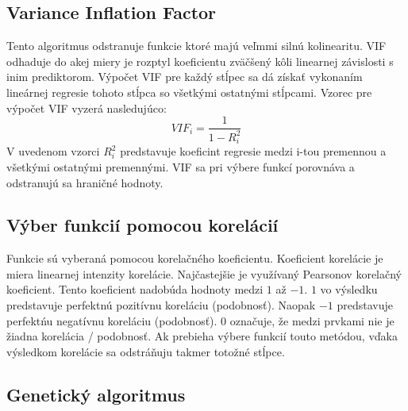 \documentclass[runningheads]{llncs}
\begin{document}
\subsection{Variance Inflation Factor}
Tento algoritmus odstranuje funkcie ktoré majú veľmmi silnú kolinearitu.
VIF odhaduje do akej miery je rozptyl koeficientu zväčšený kôli linearnej závislosti
s inim prediktorom. Výpočet VIF pre každý stĺpec sa dá získať vykonaním lineárnej 
regresie tohoto stĺpca so všetkými ostatnými stĺpcami.\cite{ref_xu}
Vzorec pre výpočet VIF vyzerá nasledujúco:
\begin{equation}
VIF_{i}=\frac{1}{1-R_{i}^{2}}
\end{equation}    
V uvedenom vzorci \begin{math}R_i^2\end{math} predstavuje koeficint regresie medzi i-tou premennou a 
všetkými ostatnými premennými. VIF sa pri výbere funkcí porovnáva a odstranujú sa hraničné hodnoty.\cite{ref_xu}

\subsection{Výber funkcií pomocou korelácií}
Funkcie sú vyberaná pomocou korelačného koeficientu. Koeficient korelácie je miera linearnej intenzity 
korelácie. Najčastejšie je využívaný Pearsonov korelačný koeficient. Tento koeficient nadobúda hodnoty medzi
\begin{math}1\end{math} až \begin{math}-1\end{math}. \begin{math}1\end{math} vo výsledku predstavuje perfektnú pozitívnu 
koreláciu (podobnosť). Naopak \begin{math}-1\end{math} predstavuje 
perfektńu negatívnu koreláciu (podobnosť). \begin{math}0\end{math} označuje, že medzi prvkami nie je žiadna korelácia / podobnosť.
Ak prebieha výbere funkcií touto metódou, vďaka výsledkom korelácie sa odstráňuju takmer totožné stĺpce.\cite{ref_xu}

\subsection{Genetický algoritmus}
\end{document}
